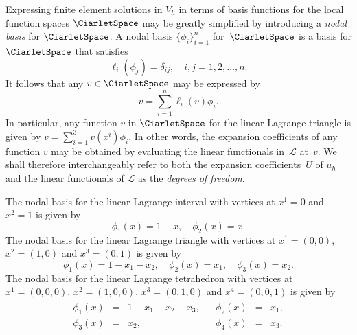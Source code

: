 Expressing finite element solutions in $V_h$ in terms of basis
functions for the local function spaces $\CiarletSpace$ may be greatly
simplified by introducing a \emph{nodal basis} for $\CiarletSpace$.  A
nodal basis $\{\phi_i\}_{i=1}^{n}$ for~$\CiarletSpace$ is a basis for
$\CiarletSpace$ that satisfies
\begin{equation} \label{eq:nodalbasis}
  \ell_i(\phi_j) = \delta_{ij}, \quad i, j = 1,2,\ldots, n.
\end{equation}
It follows that any $v \in \CiarletSpace$ may be expressed by
\begin{equation}
  v = \sum_{i=1}^{n} \ell_i(v) \phi_i.
\end{equation}
In particular, any function $v$ in $\CiarletSpace$ for the linear
Lagrange triangle is given by $v = \sum_{i=1}^3 v(x^i) \phi_i$. In
other words, the expansion coefficients of any function $v$ may be
obtained by evaluating the linear functionals in~$\mathcal{L}$
at~$v$. We shall therefore interchangeably refer to both the expansion
coefficients~$U$ of $u_h$ and the linear functionals of $\mathcal{L}$
as the \emph{degrees of freedom}.

\begin{example}
  The nodal basis for the linear Lagrange interval with vertices at
  $x^1 = 0$ and $x^2 = 1$ is given by
  \begin{equation}
    \phi_1(x) = 1 - x, \quad
    \phi_2(x) = x.
  \end{equation}
  The nodal basis for the linear Lagrange triangle with vertices at
  $x^1 = (0, 0)$, $x^2 = (1, 0)$ and $x^3 = (0, 1)$ is given by
  \begin{equation}
    \phi_1(x) = 1 - x_1 - x_2, \quad
    \phi_2(x) = x_1, \quad
    \phi_3(x) = x_2.
  \end{equation}
  The nodal basis for the linear Lagrange tetrahedron with vertices at
  $x^1 = (0, 0, 0)$, $x^2 = (1, 0, 0)$, $x^3 = (0, 1, 0)$ and $x^4 =
  (0, 0, 1)$ is given by
  \begin{equation}
    \begin{array}{cc}
      \begin{array}{rcl}
        \phi_1(x) &=& 1 - x_1 - x_2 - x_3, \\
        \phi_3(x) &=& x_2,
      \end{array}
      &
      \begin{array}{rcl}
        \phi_2(x) &=& x_1, \\
        \phi_4(x) &=& x_3.
      \end{array}
    \end{array}
  \end{equation}
\end{example}

